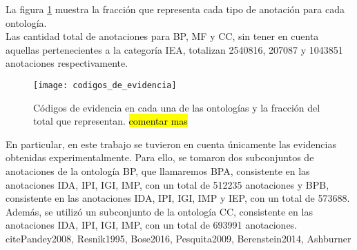 La figura \ref{fig:codigos_de_evidencia} muestra la fracción que representa cada tipo de anotación para cada ontología.\\
Las cantidad total de anotaciones para BP, MF y CC, sin tener en cuenta aquellas pertenecientes a la categoría IEA, totalizan 2540816, 207087 y 1043851 anotaciones respectivamente.
\begin{figure}[h]
    \centering
    \texttt{[image: codigos\_de\_evidencia]}
    \caption{Códigos de evidencia en cada una de las ontologías y la fracción del total que representan. \hl{comentar mas}}
    \label{fig:codigos_de_evidencia}
\end{figure}
En particular, en este trabajo se tuvieron en cuenta únicamente las evidencias obtenidas experimentalmente. Para ello, se tomaron dos subconjuntos de anotaciones de la ontología BP, que llamaremos BPA, consistente en las anotaciones IDA, IPI, IGI, IMP, con un total de 512235 anotaciones y BPB, consistente en las anotaciones IDA, IPI, IGI, IMP y IEP, con un total de 573688. Además, se utilizó un subconjunto de la ontología CC, consistente en las anotaciones IDA, IPI, IGI, IMP, con un total de 693991 anotaciones. cite{Pandey2008, Resnik1995, Bose2016, Pesquita2009, Berenstein2014, Ashburner}
